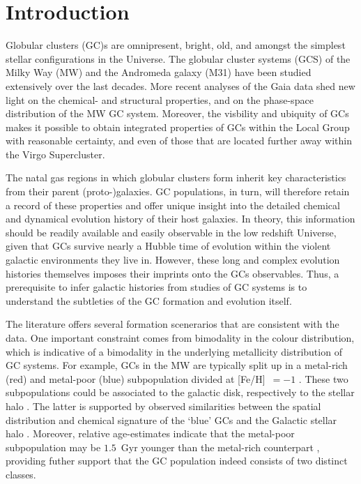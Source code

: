 \documentclass[a4paper,fleqn,usenatbib]{mnras}
\begin{document}
\section{Introduction}
Globular clusters (GC)s are omnipresent, bright, old, and amongst the simplest
stellar configurations in the Universe. The globular cluster systems (GCS) of
the Milky Way (MW) and the Andromeda galaxy (M31) have been studied extensively 
over the last decades. More recent analyses of the Gaia data shed new light on the 
chemical- and structural properties, and on the phase-space distribution 
of the MW GC system.
Moreover, the visbility and ubiquity of GCs makes it possible to obtain integrated 
properties of GCs within the Local Group with reasonable certainty, and even of 
those that are located further away within the Virgo Supercluster.

The natal gas regions in which globular clusters form inherit key characteristics 
from their parent (proto-)galaxies. GC populations, in turn, will therefore retain 
a record of these properties and offer unique insight into the detailed chemical 
and dynamical evolution history of their host galaxies. In theory, this information 
should be readily available and easily observable in the low redshift Universe, given 
that GCs survive nearly a Hubble time of evolution within the violent galactic 
environments they live in. However, these long and complex evolution histories
themselves imposes their imprints onto the GCs observables. Thus, a prerequisite to 
infer galactic histories from studies of GC systems is to understand the 
subtleties of the GC formation and evolution itself.

The literature offers several formation scenerarios that are consistent with the 
data. One important constraint comes from bimodality in the colour distribution, 
which is indicative of a bimodality in the underlying metallicity distribution 
of GC systems. For example, GCs in the MW are typically split up in a metal-rich 
(red) and metal-poor (blue) subpopulation divided at [Fe/H]~$=-1$ 
\citep[e.g.][]{Harris2001}. These two subpopulations could be associated to the 
galactic disk, respectively to the stellar halo \citep[e.g.][]{1985ApJ...293..424Z}. 
The latter is supported by observed similarities between the spatial distribution
and chemical signature of the `blue' GCs and the Galactic stellar halo 
\citep{2008A&ARv..15..145H}. Moreover, relative age-estimates indicate that the 
metal-poor subpopulation may be $1.5$~Gyr younger than the metal-rich counterpart 
\citep{2005AJ....130..116D}, providing futher support that the GC population indeed
consists of two distinct classes.
\end{document}

